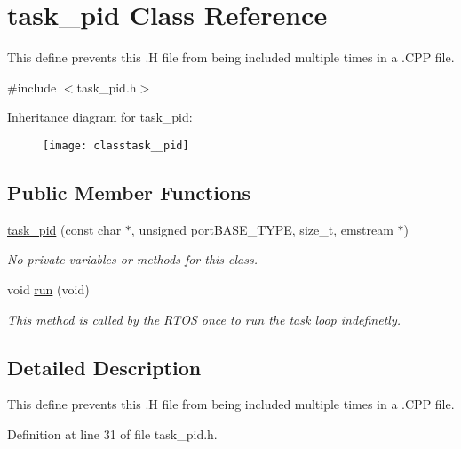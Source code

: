 \hypertarget{classtask__pid}{\section{task\-\_\-pid Class Reference}
\label{classtask__pid}
}


This define prevents this .H file from being included multiple times in a .C\-P\-P file.  




{\ttfamily \#include $<$task\-\_\-pid.\-h$>$}

Inheritance diagram for task\-\_\-pid\-:\begin{figure}[H]
\begin{center}
\leavevmode
\texttt{[image: classtask\_\_pid]}
\end{center}
\end{figure}
\subsection*{Public Member Functions}
\begin{DoxyCompactItemize}
\item 
\hyperlink{classtask__pid_a4c13bec6d43bd4cea284d0a74645db5a}{task\-\_\-pid} (const char $\ast$, unsigned port\-B\-A\-S\-E\-\_\-\-T\-Y\-P\-E, size\-\_\-t, emstream $\ast$)
\begin{DoxyCompactList}\small\item\em No private variables or methods for this class. \end{DoxyCompactList}\item 
void \hyperlink{classtask__pid_a5f113fb33b9bbecb5986ed9c8551d8e4}{run} (void)
\begin{DoxyCompactList}\small\item\em This method is called by the R\-T\-O\-S once to run the task loop indefinetly. \end{DoxyCompactList}\end{DoxyCompactItemize}


\subsection{Detailed Description}
This define prevents this .H file from being included multiple times in a .C\-P\-P file. 

Definition at line 31 of file task\-\_\-pid.\-h.



